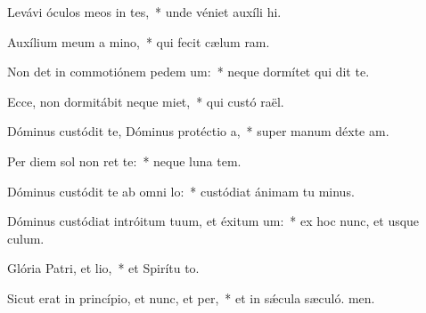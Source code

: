 \item Levávi óculos meos in tes,~* unde véniet auxíli hi.
\item Auxílium meum a mino,~* qui fecit cælum  ram.
\item Non det in commotiónem pedem um:~* neque dormítet qui dit te.
\item Ecce, non dormitábit neque miet,~* qui custó raël.
\item Dóminus custódit te, Dóminus protéctio a,~* super manum déxte am.
\item Per diem sol non ret te:~* neque luna  tem.
\item Dóminus custódit te ab omni lo:~* custódiat ánimam tu minus.
\item Dóminus custódiat intróitum tuum, et éxitum um:~* ex hoc nunc, et usque  culum.
\item Glória Patri, et lio,~* et Spirítu to.
\item Sicut erat in princípio, et nunc, et per,~* et in sǽcula sæculó. men.

